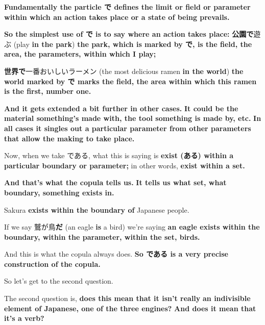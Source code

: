 {\bf Fundamentally the particle で defines the limit or field or parameter} {\bf within which an action takes place or a state of being prevails.}

\thinrule

{\bf So the simplest use of で is to say where an action takes place:} {\bf 公園で}遊ぶ (play {\bf in the park}) {\bf the park, which is marked by で, is the field, the area, the parameters, within which I play;}

{}

{\bf 世界で}一番おいしいラーメン (the most delicious ramen {\bf in the world}) {\bf the world marked by で marks the field, the area within which this ramen is the first, number one.}

\thinrule

{\bf And it gets extended a bit further in other cases.} {\bf It could be the material something's made with, the tool something is made by, etc.} {\bf In all cases it singles out a particular parameter from other parameters} {\bf that allow the making to take place.}

\stopsectionlevel

\stopsectionlevel

\startsectionlevel[title={Back to である},reference={back-to-である}]

Now, when we take である, what this is saying is {\bf exist (ある) within a particular boundary or parameter;} in other words, {\bf exist within a set.}

{}

{\bf And that's what the copula tells us.} {\bf It tells us what set, what boundary, something exists in.}

Sakura {\bf exists within the boundary of} Japanese people.

If we say 鷲が鳥{\bf だ} (an eagle {\bf is} a bird) we're saying {\bf an eagle exists within the boundary, within the parameter, within the set, birds.}

And this is what the copula always does. {\bf So である is a very precise construction of the copula.}

So let's get to the second question.

\startsectionlevel[title={Is である / the copula a verb?},reference={is-である-the-copula-a-verb}]

The second question is, {\bf does this mean that it isn't really} {\bf an indivisible element of Japanese, one of the three engines?} {\bf And does it mean that it's a verb?}

